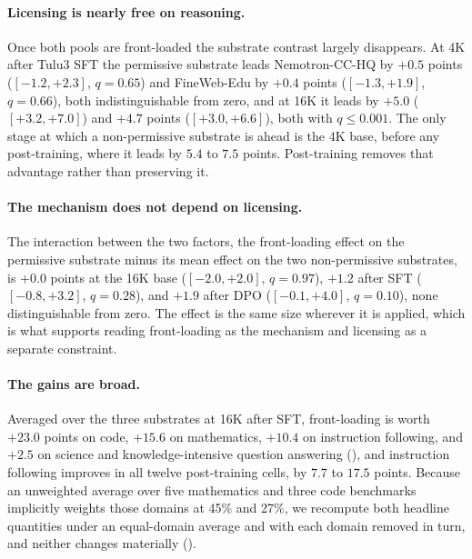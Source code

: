 \documentclass{article}
\begin{document}
\paragraph{Licensing is nearly free on reasoning.}
Once both pools are front-loaded the substrate contrast largely disappears. At 4K after Tulu3 SFT the permissive substrate leads Nemotron-CC-HQ by $+0.5$ points ($[-1.2, +2.3]$, $q = 0.65$) and FineWeb-Edu by $+0.4$ points ($[-1.3, +1.9]$, $q = 0.66$), both indistinguishable from zero, and at 16K it leads by $+5.0$ ($[+3.2, +7.0]$) and $+4.7$ points ($[+3.0, +6.6]$), both with $q \le 0.001$. The only stage at which a non-permissive substrate is ahead is the 4K base, before any post-training, where it leads by $5.4$ to $7.5$ points. Post-training removes that advantage rather than preserving it.

\paragraph{The mechanism does not depend on licensing.}
The interaction between the two factors, the front-loading effect on the permissive substrate minus its mean effect on the two non-permissive substrates, is $+0.0$ points at the 16K base ($[-2.0, +2.0]$, $q = 0.97$), $+1.2$ after SFT ($[-0.8, +3.2]$, $q = 0.28$), and $+1.9$ after DPO ($[-0.1, +4.0]$, $q = 0.10$), none distinguishable from zero. The effect is the same size wherever it is applied, which is what supports reading front-loading as the mechanism and licensing as a separate constraint.

\paragraph{The gains are broad.}
Averaged over the three substrates at 16K after SFT, front-loading is worth $+23.0$ points on code, $+15.6$ on mathematics, $+10.4$ on instruction following, and $+2.5$ on science and knowledge-intensive question answering (), and instruction following improves in all twelve post-training cells, by $7.7$ to $17.5$ points. Because an unweighted average over five mathematics and three code benchmarks implicitly weights those domains at 45\% and 27\%, we recompute both headline quantities under an equal-domain average and with each domain removed in turn, and neither changes materially ().
\end{document}

